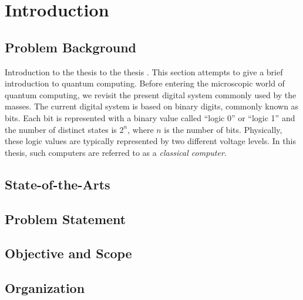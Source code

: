 \documentclass{utmthesis}
\begin{document}
\tableofcontents
\listoftables
\listoffigures


\listofabbre
{}


\listofsymbols
{}


\listofappendices

\onehalfspacing
\mainmatter


\chapter{Introduction}
\section{Problem Background}
Introduction to the thesis \cite{b2} to the thesis \cite{okamoto2004improved}. This section attempts to give a brief introduction to quantum computing. Before entering the microscopic world of quantum computing, we revisit the present digital system commonly used by the masses.  The current digital system is based on binary digits, commonly known as bits.  Each bit is represented with a binary value called ``logic 0'' or ``logic 1'' and the number of distinct states is $2^n$, where $n$ is the number of bits.  Physically, these logic values are typically represented by two different voltage levels. In this thesis, such computers are referred to as a \emph{classical computer}.
\section{State-of-the-Arts}
\section{Problem Statement}
\section{Objective and Scope}
\section{Organization}


\end{document}
